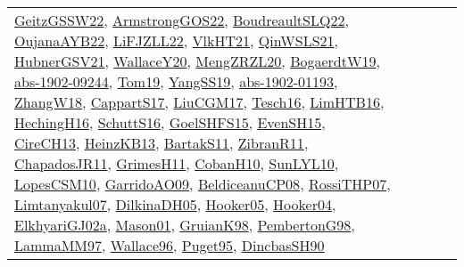 {\begin{longtable}{lp{3cm}>{\raggedright}p{6cm}>{\raggedright}p{6cm}p{8cm}}
\href{papers/GeitzGSSW22.pdf}{GeitzGSSW22}\cite{GeitzGSSW22}, \href{papers/ArmstrongGOS22.pdf}{ArmstrongGOS22}\cite{ArmstrongGOS22}, \href{papers/BoudreaultSLQ22.pdf}{BoudreaultSLQ22}\cite{BoudreaultSLQ22}, \href{papers/OujanaAYB22.pdf}{OujanaAYB22}\cite{OujanaAYB22}, \href{papers/LiFJZLL22.pdf}{LiFJZLL22}\cite{LiFJZLL22}, \href{articles/VlkHT21.pdf}{VlkHT21}\cite{VlkHT21}, \href{articles/QinWSLS21.pdf}{QinWSLS21}\cite{QinWSLS21}, \href{articles/HubnerGSV21.pdf}{HubnerGSV21}\cite{HubnerGSV21}, \href{articles/WallaceY20.pdf}{WallaceY20}\cite{WallaceY20}, \href{articles/MengZRZL20.pdf}{MengZRZL20}\cite{MengZRZL20}, \href{papers/BogaerdtW19.pdf}{BogaerdtW19}\cite{BogaerdtW19}, \href{articles/abs-1902-09244.pdf}{abs-1902-09244}\cite{abs-1902-09244}, \href{papers/Tom19.pdf}{Tom19}\cite{Tom19}, \href{papers/YangSS19.pdf}{YangSS19}\cite{YangSS19}, \href{articles/abs-1902-01193.pdf}{abs-1902-01193}\cite{abs-1902-01193}, \href{articles/ZhangW18.pdf}{ZhangW18}\cite{ZhangW18}, \href{papers/CappartS17.pdf}{CappartS17}\cite{CappartS17}, \href{papers/LiuCGM17.pdf}{LiuCGM17}\cite{LiuCGM17}, \href{papers/Tesch16.pdf}{Tesch16}\cite{Tesch16}, \href{papers/LimHTB16.pdf}{LimHTB16}\cite{LimHTB16}, \href{papers/HechingH16.pdf}{HechingH16}\cite{HechingH16}, \href{papers/SchuttS16.pdf}{SchuttS16}\cite{SchuttS16}, \href{articles/GoelSHFS15.pdf}{GoelSHFS15}\cite{GoelSHFS15}, \href{papers/EvenSH15.pdf}{EvenSH15}\cite{EvenSH15}, \href{papers/CireCH13.pdf}{CireCH13}\cite{CireCH13}, \href{papers/HeinzKB13.pdf}{HeinzKB13}\cite{HeinzKB13}, \href{articles/BartakS11.pdf}{BartakS11}\cite{BartakS11}, \href{papers/ZibranR11.pdf}{ZibranR11}\cite{ZibranR11}, \href{papers/ChapadosJR11.pdf}{ChapadosJR11}\cite{ChapadosJR11}, \href{papers/GrimesH11.pdf}{GrimesH11}\cite{GrimesH11}, \href{papers/CobanH10.pdf}{CobanH10}\cite{CobanH10}, \href{papers/SunLYL10.pdf}{SunLYL10}\cite{SunLYL10}, \href{articles/LopesCSM10.pdf}{LopesCSM10}\cite{LopesCSM10}, \href{articles/GarridoAO09.pdf}{GarridoAO09}\cite{GarridoAO09}, \href{papers/BeldiceanuCP08.pdf}{BeldiceanuCP08}\cite{BeldiceanuCP08}, \href{papers/RossiTHP07.pdf}{RossiTHP07}\cite{RossiTHP07}, \href{papers/Limtanyakul07.pdf}{Limtanyakul07}\cite{Limtanyakul07}, \href{papers/DilkinaDH05.pdf}{DilkinaDH05}\cite{DilkinaDH05}, \href{articles/Hooker05.pdf}{Hooker05}\cite{Hooker05}, \href{papers/Hooker04.pdf}{Hooker04}\cite{Hooker04}, \href{papers/ElkhyariGJ02a.pdf}{ElkhyariGJ02a}\cite{ElkhyariGJ02a}, \href{articles/Mason01.pdf}{Mason01}\cite{Mason01}, \href{papers/GruianK98.pdf}{GruianK98}\cite{GruianK98}, \href{papers/PembertonG98.pdf}{PembertonG98}\cite{PembertonG98}, \href{articles/LammaMM97.pdf}{LammaMM97}\cite{LammaMM97}, \href{articles/Wallace96.pdf}{Wallace96}\cite{Wallace96}, \href{papers/Puget95.pdf}{Puget95}\cite{Puget95}, \href{articles/DincbasSH90.pdf}{DincbasSH90}\cite{DincbasSH90}\\

\end{longtable}}
